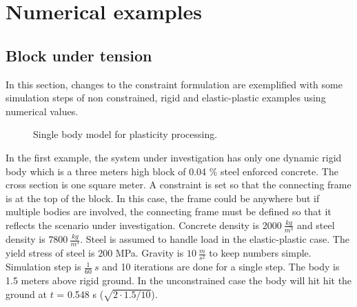 \section{Numerical examples}

\subsection{Block under tension}
In this section, changes to the constraint formulation are exemplified with some simulation steps
of non constrained, rigid and
elastic-plastic examples using numerical values.

\begin{figure}
\centering
{}
\caption{Single body model for plasticity processing.}
\label{fig:tensionModel}
\end{figure}

In the first example, the system under investigation
has only one dynamic rigid body which is a three meters high block of 0.04 \% steel enforced concrete. 
The cross section is one square meter.
A constraint is set so that the connecting frame is at the top of the block. 
In this case, the frame could be anywhere but if multiple bodies are involved, the connecting frame must be defined
so that it reflects the scenario under investigation.
Concrete density is $2000\ \frac{kg}{m^3}$ and steel density is $7800\ \frac{kg}{m^3}$. 
Steel is assumed to handle load in the elastic-plastic case. The yield stress of steel is 200 MPa.
Gravity is $10\ \frac{m}{s^2}$ to keep numbers simple. 
Simulation step is $\frac{1}{60}\ s$ and 10 
iterations are done for a single step.
The body is 1.5 meters above rigid ground. In the unconstrained case the body will hit hit the ground at $t$ = 0.548 s 
($\sqrt{2 \cdot 1.5 / 10}$).

